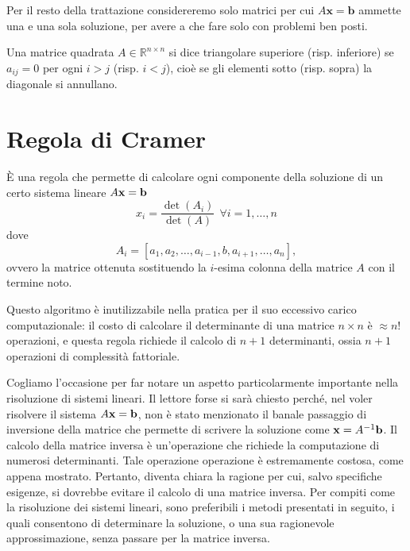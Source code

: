 Per il resto della trattazione considereremo solo matrici per cui $\displaystyle A\mathbf{x=b}$ ammette una e una sola soluzione, per avere a che fare solo con problemi ben posti.

\begin{definition}
  Una matrice quadrata $A\in \mathbb{R}^{n\times n}$ si dice triangolare superiore (risp. inferiore) se $a_{ij} =0$ per ogni $i >j$ (risp. $i< j$), cioè se gli elementi sotto (risp. sopra) la diagonale si annullano.
\end{definition}

\section{Regola di Cramer}

È una regola che permette di calcolare ogni componente della soluzione di un certo sistema lineare $A\mathbf{x}=\mathbf{b}$
\begin{equation*}
x_{i} =\frac{\det( A_{i})}{\det(A)} \ \ \forall i=1,\dotsc ,n
\end{equation*}
dove
\begin{equation*}
A_{i} =[ a_{1} ,a_{2} ,\dotsc ,a_{i-1}, b,a_{i+1}  ,\dotsc ,a_{n}],
\end{equation*}
ovvero la matrice ottenuta sostituendo la $i$-esima colonna della matrice $A$ con il termine noto.

Questo algoritmo è inutilizzabile nella pratica per il suo eccessivo carico computazionale:
il costo di calcolare il determinante di una matrice $n\times n$ è $\approx n!$ operazioni, e questa regola richiede il calcolo di $n+1$ determinanti, ossia $n+1$ operazioni di complessità fattoriale.

Cogliamo l'occasione per far notare un aspetto particolarmente importante nella risoluzione di sistemi lineari. Il lettore forse si sarà chiesto perché, nel voler risolvere il sistema $A\mathbf{x}=\mathbf{b}$, non è stato menzionato il banale passaggio di inversione della matrice che permette di scrivere la soluzione come $\mathbf{x}=A^{-1}\mathbf{b}$. Il calcolo della matrice inversa è un'operazione che richiede la computazione di numerosi determinanti.
Tale operazione operazione è estremamente costosa, come appena mostrato.
Pertanto, diventa chiara la ragione per cui, salvo specifiche esigenze, si dovrebbe evitare il calcolo di una matrice inversa.
Per compiti come la risoluzione dei sistemi lineari, sono preferibili i metodi presentati in seguito, i quali consentono di determinare la soluzione, o una sua ragionevole approssimazione, senza passare per la matrice inversa.

